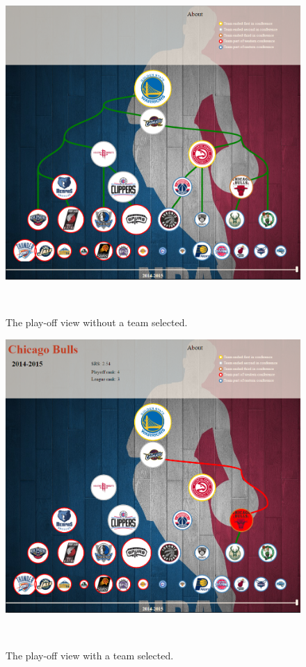 \documentclass[chi_draft]{sigchi}
\begin{document}
\begin{figure}
\centering
  \includegraphics[width=1.0\columnwidth]{figures/playoffviewwithcontext}
  \caption{The play-off view without a team selected.}~\label{fig:playoffviewnoteam}
\end{figure}

\begin{figure}
\centering
  \includegraphics[width=1.0\columnwidth]{figures/playoffviewteamselected}
  \caption{The play-off view with a team selected.}~\label{fig:playoffviewteam}
\end{figure}
\end{document}
